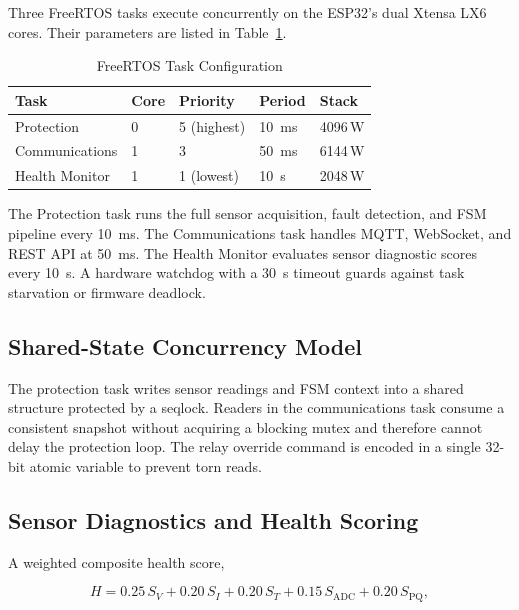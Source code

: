 \documentclass[conference]{IEEEtran}
\begin{document}
Three FreeRTOS tasks execute concurrently on the ESP32's dual Xtensa
LX6 cores.  Their parameters are listed in Table~\ref{tab:tasks}.

\begin{table}[t]
  \caption{FreeRTOS Task Configuration}
  \label{tab:tasks}
  \centering
  \renewcommand{\arraystretch}{1.15}
  \begin{tabular}{lllll}
    \toprule
    \textbf{Task} & \textbf{Core} & \textbf{Priority} & \textbf{Period} & \textbf{Stack} \\
    \midrule
    Protection     & 0 & 5 (highest) & \SI{10}{\milli\second} & 4096\,W \\
    Communications & 1 & 3           & \SI{50}{\milli\second} & 6144\,W \\
    Health Monitor & 1 & 1 (lowest)  & \SI{10}{\second}       & 2048\,W \\
    \bottomrule
  \end{tabular}
\end{table}

The Protection task runs the full sensor acquisition, fault detection,
and FSM pipeline every \SI{10}{\milli\second}.  The Communications task
handles MQTT, WebSocket, and REST API at \SI{50}{\milli\second}.  The
Health Monitor evaluates sensor diagnostic scores every \SI{10}{\second}.
A hardware watchdog with a \SI{30}{\second} timeout guards against task
starvation or firmware deadlock.

\subsection{Shared-State Concurrency Model}

The protection task writes sensor readings and FSM context into a
shared structure protected by a seqlock.  Readers in the communications
task consume a consistent snapshot without acquiring a blocking mutex
and therefore cannot delay the protection loop.  The relay override
command is encoded in a single 32-bit atomic variable to prevent torn
reads.

\subsection{Sensor Diagnostics and Health Scoring}

A weighted composite health score,

\begin{equation}
  H = 0.25\,S_V + 0.20\,S_I + 0.20\,S_T + 0.15\,S_{\text{ADC}}
    + 0.20\,S_{\text{PQ}},
  \label{eq:health}
\end{equation}
\end{document}
